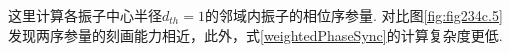 \documentclass{article}
\begin{document}
\vspace{-0.5cm}
这里计算各振子中心半径$d_{th}=1$的邻域内振子的相位序参量.
对比图\ref{fig:fig234c.5}发现两序参量的刻画能力相近，此外，式\ref{weightedPhaseSync}的计算复杂度更低.



		





		
\end{document}
